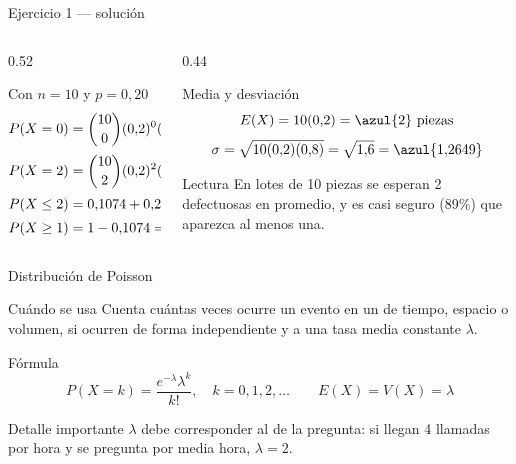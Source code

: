\documentclass[aspectratio=169,10pt]{beamer}
\begin{document}
\begin{frame}{Ejercicio 1 — solución}
  \begin{columns}[T,onlytextwidth]
    \begin{column}{0.52\textwidth}
      \begin{block}{Con $n=10$ y $p=0{,}20$}
        \footnotesize
        \begin{align*}
          P(X=0)&=\binom{10}{0}(0{,}2)^{0}(0{,}8)^{10}=\azul{0{,}1074}\\[0.2em]
          P(X=2)&=\binom{10}{2}(0{,}2)^{2}(0{,}8)^{8}=\azul{0{,}3020}\\[0.2em]
          P(X\le 2)&=0{,}1074+0{,}2684+0{,}3020=\azul{0{,}6778}\\[0.2em]
          P(X\ge 1)&=1-0{,}1074=\azul{0{,}8926}
        \end{align*}
      \end{block}
    \end{column}
    \begin{column}{0.44\textwidth}
      \begin{exampleblock}{Media y desviación}
        \footnotesize
        \[ E(X)=10(0{,}2)=\azul{2} \text{ piezas} \]
        \[ \sigma=\sqrt{10(0{,}2)(0{,}8)}=\sqrt{1{,}6}=\azul{1{,}2649} \]
      \end{exampleblock}
      \begin{alertblock}{Lectura}
        \footnotesize
        En lotes de 10 piezas se esperan 2 defectuosas en promedio, y es casi
        seguro (89\%) que aparezca al menos una.
      \end{alertblock}
    \end{column}
  \end{columns}
\end{frame}


\begin{frame}{Distribución de Poisson}
  \begin{block}{Cuándo se usa}
    \footnotesize
    Cuenta cuántas veces ocurre un evento en un  de
    tiempo, espacio o volumen, si ocurren de forma independiente y a una tasa
    media constante $\lambda$.
  \end{block}

  \vspace{0.1cm}
  \begin{block}{Fórmula}
    \[ P(X=k)=\frac{e^{-\lambda}\lambda^{k}}{k!},\quad k=0,1,2,\dots
       \qquad E(X)=V(X)=\lambda \]
  \end{block}

  \begin{alertblock}{Detalle importante}
    \footnotesize
    $\lambda$ debe corresponder al  de la pregunta:
    si llegan 4 llamadas por hora y se pregunta por media hora, $\lambda=2$.
  \end{alertblock}
\end{frame}
\end{document}
